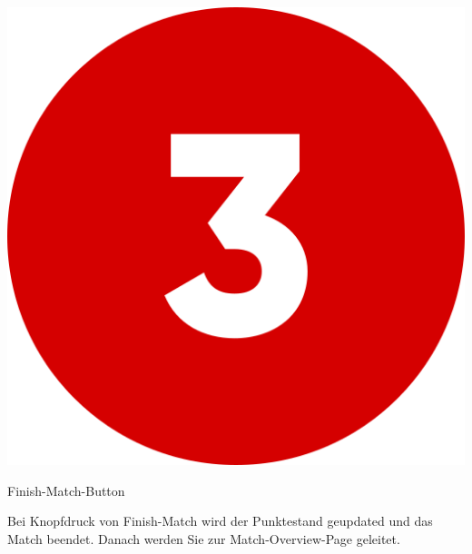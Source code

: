 \bigskip
\includegraphics[scale=0.05]{pics/user-guide/numbers/number-3.png} \begin{LARGE} Finish-Match-Button \end{LARGE}

Bei Knopfdruck von Finish-Match wird der Punktestand geupdated und das Match beendet. Danach werden Sie zur Match-Overview-Page geleitet.